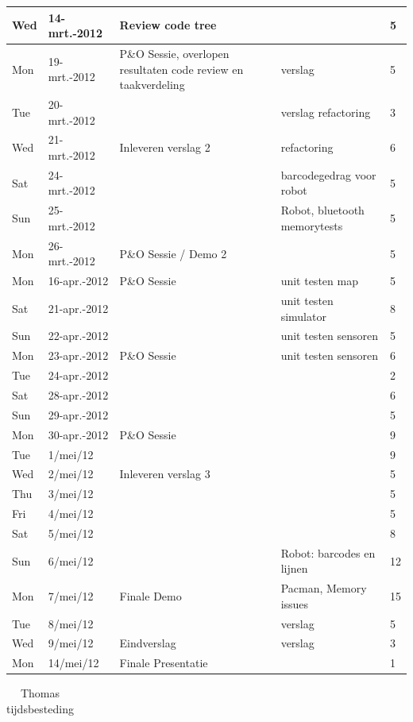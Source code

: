 \documentclass[12pt,a4paper]{report}
\begin{document}
\begin{landscape}
\begin{longtable}{llp{7cm}p{10cm}l}
\hline
Wed & 14-mrt.-2012 & Review code tree  &  & 5 \\ 
\hline
Mon & 19-mrt.-2012 & P\&O Sessie, overlopen resultaten code review en taakverdeling & verslag & 5 \\ 
\hline
Tue & 20-mrt.-2012 &  & verslag  refactoring & 3 \\ 
\hline
Wed & 21-mrt.-2012 & Inleveren verslag 2 & refactoring & 6 \\ 
\hline
Sat & 24-mrt.-2012 &  & barcodegedrag voor robot & 5 \\ 
\hline
Sun & 25-mrt.-2012 &  & Robot, bluetooth  memorytests & 5 \\ 
\hline
Mon & 26-mrt.-2012 & P\&O Sessie / Demo 2 &  & 5 \\ 
\hline
Mon & 16-apr.-2012 & P\&O Sessie & unit testen map & 5 \\ 
\hline
Sat & 21-apr.-2012 &  & unit testen simulator & 8 \\ 
\hline
Sun & 22-apr.-2012 &  & unit testen sensoren & 5 \\ 
\hline
Mon & 23-apr.-2012 & P\&O Sessie & unit testen sensoren & 6 \\ 
\hline
Tue & 24-apr.-2012 &  &  & 2 \\ 
\hline
Sat & 28-apr.-2012 &  &  & 6 \\ 
\hline
Sun & 29-apr.-2012 &  &  & 5 \\ 
\hline
Mon & 30-apr.-2012 & P\&O Sessie &  & 9 \\ 
\hline
Tue & 1/mei/12 &  &  & 9 \\ 
\hline
Wed & 2/mei/12 & Inleveren verslag 3 &  & 5 \\ 
\hline
Thu & 3/mei/12 &  &  & 5 \\ 
\hline
Fri & 4/mei/12 &  &  & 5 \\ 
\hline
Sat & 5/mei/12 &  &  & 8 \\ 
\hline
Sun & 6/mei/12 &  & Robot: barcodes en lijnen & 12 \\ 
\hline
Mon & 7/mei/12 & Finale Demo & Pacman, Memory issues & 15 \\ 
\hline
Tue & 8/mei/12 &  & verslag & 5 \\ 
\hline
Wed & 9/mei/12 & Eindverslag & verslag & 3 \\ 
\hline
Mon & 14/mei/12 & Finale Presentatie &  & 1 \\ 
\hline
\end{longtable}
\normalsize

\begin{longtable}{llp{7cm}p{10cm}l}
\caption{Thomas tijdsbesteding} \\


\end{longtable}
\end{landscape}
\end{document}
